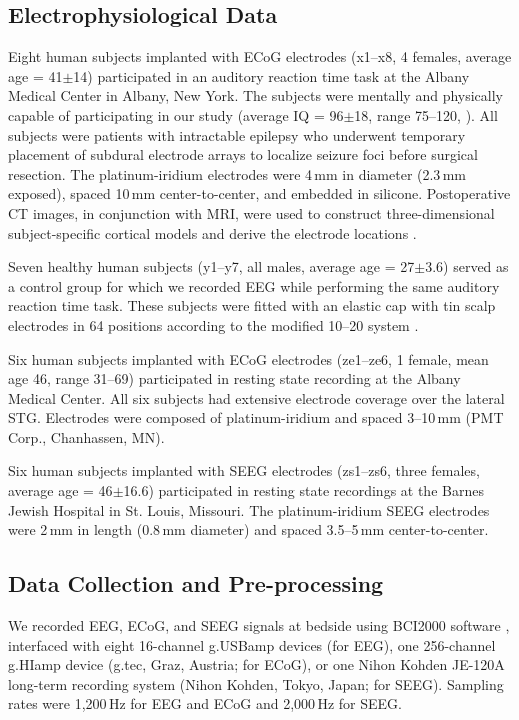 \documentclass[11pt]{article}
\begin{document}
\subsection{Electrophysiological Data}
Eight human subjects implanted with ECoG electrodes (x1--x8, 4 females, average age = 41$\pm$14) participated in an auditory reaction time task at the Albany Medical Center in Albany, New York. The subjects were mentally and physically capable of participating in our study (average IQ = 96$\pm$18, range 75--120, \citealp{wechsler1997}). All subjects were patients with intractable epilepsy who underwent temporary placement of subdural electrode arrays to localize seizure foci before surgical resection. The platinum-iridium electrodes were 4\,mm in diameter (2.3\,mm exposed), spaced 10\,mm center-to-center, and embedded in silicone. Postoperative CT images, in conjunction with MRI, were used to construct three-dimensional subject-specific cortical models and derive the electrode locations \citep{coon2016}.

Seven healthy human subjects (y1--y7, all males, average age = 27$\pm$3.6) served as a control group for which we recorded EEG while performing the same auditory reaction time task. These subjects were fitted with an elastic cap \citep{blom1982} with tin \citep{polich1985} scalp electrodes in 64 positions according to the modified 10--20 system \citep{acharya2016}.

Six human subjects implanted with ECoG electrodes (ze1--ze6, 1 female, mean age 46, range 31--69) participated in resting state recording at the Albany Medical Center. All six subjects had extensive electrode coverage over the lateral STG. Electrodes were composed of platinum-iridium and spaced 3--10\,mm (PMT Corp., Chanhassen, MN).

Six human subjects implanted with SEEG electrodes (zs1--zs6, three females, average age = 46$\pm$16.6) participated in resting state recordings at the Barnes Jewish Hospital in St. Louis, Missouri. The platinum-iridium SEEG electrodes were 2\,mm in length (0.8\,mm diameter) and spaced 3.5--5\,mm center-to-center.

\subsection{Data Collection and Pre-processing}
We recorded EEG, ECoG, and SEEG signals at bedside using BCI2000 software \citep{schalk2004}, interfaced with eight 16-channel g.USBamp devices (for EEG), one 256-channel g.HIamp device (g.tec, Graz, Austria; for ECoG), or one Nihon Kohden JE-120A long-term recording system (Nihon Kohden, Tokyo, Japan; for SEEG). Sampling rates were 1{,}200\,Hz for EEG and ECoG and 2{,}000\,Hz for SEEG.
\end{document}
